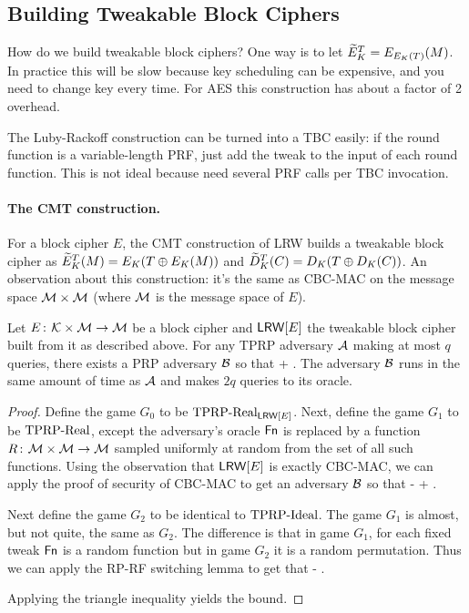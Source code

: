 \subsection*{Building Tweakable Block Ciphers} How do we build tweakable block ciphers? One way is to let $\widetilde{E}^{T}_{K} = E_{E_K(T)}(M)$. In practice this will be slow because key scheduling can be expensive, and you need to change key every time. For AES this construction has about a factor of 2 overhead.

The Luby-Rackoff construction can be turned into a TBC easily: if the round function is a variable-length PRF, just add the tweak to the input of each round function. This is not ideal because need several PRF calls per TBC invocation.

\paragraph{The CMT construction.} For a block cipher $E$, the CMT construction of LRW builds a tweakable block cipher as $\widetilde{E}^T_K(M) = E_K(T\oplus E_K(M))$ and $\widetilde{D}^T_K(C) = D_K(T\oplus D_K(C))$.
An observation about this construction: it's the same as CBC-MAC on the message space ${\cal M}\times{\cal M}$ (where ${\cal M}$ is the message space of $E$).

\begin{theorem}
  Let $E{{\kern .05em}\colon{\kern .05em}}{\cal K}\times{\cal M}\rightarrow{\cal M}$ be a block cipher and $\mathsf{LRW}[E]$ the tweakable block cipher built from it as described above. For any TPRP adversary ${\mathcal A}$ making at most $q$ queries, there exists a PRP adversary ${\mathcal B}$ so that
  \bnm
  \AdvTPRP{\lrw[E]}{\advA} \leq {} + \; .
  \enm
  The adversary ${\mathcal B}$ runs in the same amount of time as ${\mathcal A}$ and makes $2q$ queries to its oracle.
\end{theorem}
\begin{proof}
  Define the game $G_0$ to be $\text{TPRP-Real}_{\mathsf{LRW}[E]}$. Next, define the game $G_1$ to be $\text{TPRP-Real}$, except the adversary's oracle $\mathsf{Fn}$ is replaced by a function $R{{\kern .05em}\colon{\kern .05em}}{\cal M}\times{\cal M}\rightarrow{\cal M}$ sampled uniformly at random from the set of all such functions. Using the observation that $\mathsf{LRW}[E]$ is exactly CBC-MAC, we can apply the proof of security of CBC-MAC to get an adversary ${\mathcal B}$ so that
  \bnm
  \left\lvert{}-\right\rvert \leq {} + \; .
  \enm

  Next define the game $G_2$ to be identical to $\text{TPRP-Ideal}$. The game $G_1$ is almost, but not quite, the same as $G_2$. The difference is that in game $G_1$, for each fixed tweak $\mathsf{Fn}$ is a random function but in game $G_2$ it is a random permutation. Thus we can apply the RP-RF switching lemma to get that
  \bnm
  \left\lvert{}-\right\rvert \leq {}\; .
  \enm

  Applying the triangle inequality yields the bound.\hfill\qedsym
\end{proof}

